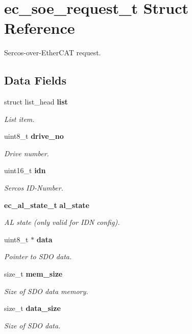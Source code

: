 \section{ec\-\_\-soe\-\_\-request\-\_\-t \-Struct \-Reference}
\label{structec__soe__request__t}


\-Sercos-\/over-\/\-Ether\-C\-A\-T request.  


\subsection*{\-Data \-Fields}
\begin{DoxyCompactItemize}
\item 
struct list\-\_\-head {\bf list}
\begin{DoxyCompactList}\small\item\em \-List item. \end{DoxyCompactList}\item 
uint8\-\_\-t {\bf drive\-\_\-no}
\begin{DoxyCompactList}\small\item\em \-Drive number. \end{DoxyCompactList}\item 
uint16\-\_\-t {\bf idn}
\begin{DoxyCompactList}\small\item\em \-Sercos \-I\-D-\/\-Number. \end{DoxyCompactList}\item 
{\bf ec\-\_\-al\-\_\-state\-\_\-t} {\bf al\-\_\-state}
\begin{DoxyCompactList}\small\item\em \-A\-L state (only valid for \-I\-D\-N config). \end{DoxyCompactList}\item 
uint8\-\_\-t $\ast$ {\bf data}
\begin{DoxyCompactList}\small\item\em \-Pointer to \-S\-D\-O data. \end{DoxyCompactList}\item 
size\-\_\-t {\bf mem\-\_\-size}
\begin{DoxyCompactList}\small\item\em \-Size of \-S\-D\-O data memory. \end{DoxyCompactList}\item 
size\-\_\-t {\bf data\-\_\-size}
\begin{DoxyCompactList}\small\item\em \-Size of \-S\-D\-O data. \end{DoxyCompactList}\item 

\end{DoxyCompactItemize}
